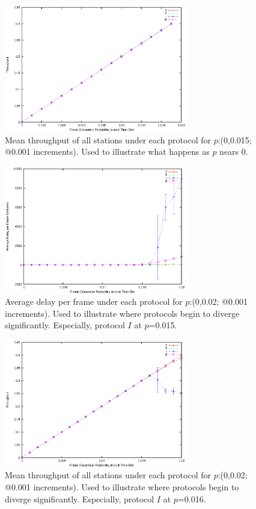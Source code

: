 \documentclass[twocolumn]{article}
\begin{document}
\begin{figure}
    \centering \includegraphics[width=8cm]{plots/small_throughput.eps}
    \caption{\footnotesize Mean throughput of all stations under each protocol
    for $p$:(0,0.015; @0.001 increments). Used to illustrate what happens as $p$
    nears 0.} \label{fig:throughput_small}
\end{figure}

\begin{figure}
    \centering \includegraphics[width=8cm]{plots/ib_diverge_delay.eps}
    \caption{\footnotesize Average delay per frame under each protocol for
    $p$:(0,0.02; @0.001 increments). Used to illustrate where protocols begin to
    diverge significantly. Especially, protocol $I$ at $p$=0.015.}
    \label{fig:delay_ib}
\end{figure}

\begin{figure}
    \centering \includegraphics[width=8cm]{plots/ib_diverge_throughput.eps}
    \caption{\footnotesize Mean throughput of all stations under each protocol
    for $p$:(0,0.02; @0.001 increments). Used to illustrate where protocols
    begin to diverge significantly. Especially, protocol $I$ at $p$=0.016.}
    \label{fig:throughput_ib}
\end{figure}
\end{document}
